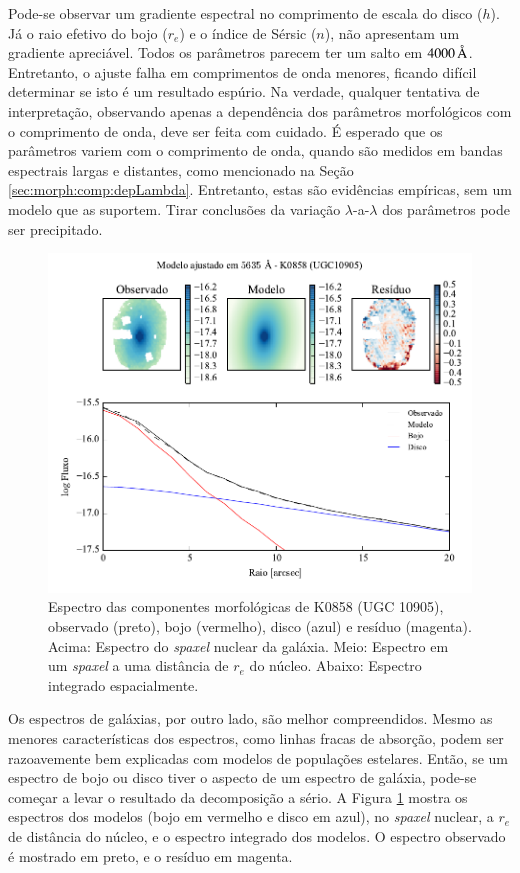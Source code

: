 Pode-se observar um gradiente espectral no comprimento de escala do disco ($h$).
Já o raio efetivo do bojo ($r_e$) e o índice de Sérsic ($n$), não apresentam um
gradiente apreciável. Todos os parâmetros parecem ter um salto em
$4000\,\text{\normalfont\AA}$. Entretanto, o ajuste falha em comprimentos de onda menores,
ficando difícil determinar se isto é um resultado espúrio. Na verdade, qualquer
tentativa de interpretação, observando apenas a dependência dos parâmetros
morfológicos com o comprimento de onda, deve ser feita com cuidado. É esperado
que os parâmetros variem com o comprimento de onda, quando são medidos em bandas
espectrais largas e distantes, como mencionado na Seção
\ref{sec:morph:comp:depLambda}. Entretanto, estas são evidências empíricas, sem
um modelo que as suportem. Tirar conclusões da variação $\lambda$-a-$\lambda$
dos parâmetros pode ser precipitado.

\begin{figure}
	\includegraphics[page=4]{figuras-decomp/K0858_sample006a}
	\caption[Espectro das componentes morfológicas de K0858 (UGC 10905). Acima,
	espectros] {Espectro das componentes morfológicas de K0858 (UGC 10905),
	observado (preto), bojo (vermelho), disco (azul) e resíduo (magenta). Acima:
	Espectro do {\em spaxel} nuclear da galáxia. Meio: Espectro em um {\em spaxel}
	a uma distância de $r_e$ do núcleo. Abaixo: Espectro integrado espacialmente.}
	\label{fig:decompSpectra}
\end{figure}

Os espectros de galáxias, por outro lado, são melhor compreendidos. Mesmo as
menores características dos espectros, como linhas fracas de absorção, podem ser
razoavemente bem explicadas com modelos de populações estelares. Então, se um
espectro de bojo ou disco tiver o aspecto de um espectro de galáxia, pode-se
começar a levar o resultado da decomposição a sério. A Figura
\ref{fig:decompSpectra} mostra os espectros dos modelos (bojo em vermelho e
disco em azul), no {\em spaxel} nuclear, a $r_e$ de distância do núcleo, e o
espectro integrado dos modelos. O espectro observado é mostrado em preto, e o
resíduo em magenta.


